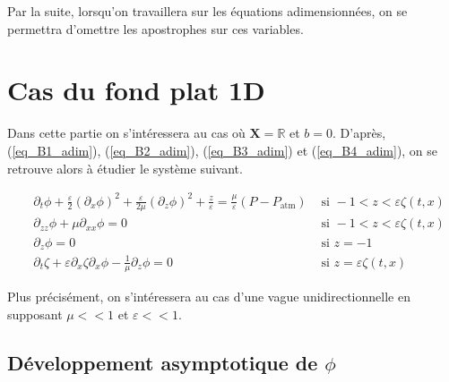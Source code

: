 \documentclass[12pt,a4paper]{article}
\numberwithin{equation}{section}
\begin{document}
Par la suite, lorsqu'on travaillera sur les équations adimensionnées, on se permettra d'omettre les apostrophes sur ces variables.
\newpage
\section{Cas du fond plat 1D} 

Dans cette partie on s'intéressera au cas où $\textbf{X} = \mathbb{R}$ et $b = 0$. D'après, (\ref{eq_B1_adim}), (\ref{eq_B2_adim}), (\ref{eq_B3_adim}) et (\ref{eq_B4_adim}), on se retrouve alors à étudier le système suivant.

\begin{align}
~&\partial_{t} \phi + 
     \frac{\varepsilon}{2}(\partial_{x}\phi)^2+ \frac{\varepsilon}{2\mu}(\partial_{z}\phi)^2
     + \frac{z}{\varepsilon} 
     = \frac{\mu}{\varepsilon}(P-P_{\text{atm}}) &\text{ si } -1 < z < \varepsilon \zeta(t,x) \label{eq_k1}\\
~&\partial_{zz}\phi + \mu \partial_{x x}\phi  = 0  &\text{ si } -1 < z < \varepsilon \zeta(t,x) \label{eq_k2}\\
~&\partial_{z}\phi = 0&\text{ si } z  = - 1\label{eq_k3}\\
~&\partial_{t}\zeta +  \varepsilon \partial_{x} \zeta  \partial_{x}\phi  - \frac{1}{\mu}\partial_{z}\phi = 0 &\text{ si } z = \varepsilon \zeta(t,x)\label{eq_k4}
\end{align}

Plus précisément, on s'intéressera au cas d'une vague unidirectionnelle en supposant $\mu << 1$ et $\varepsilon<<1$.
\subsection{Développement asymptotique de $\phi$}
\end{document}
